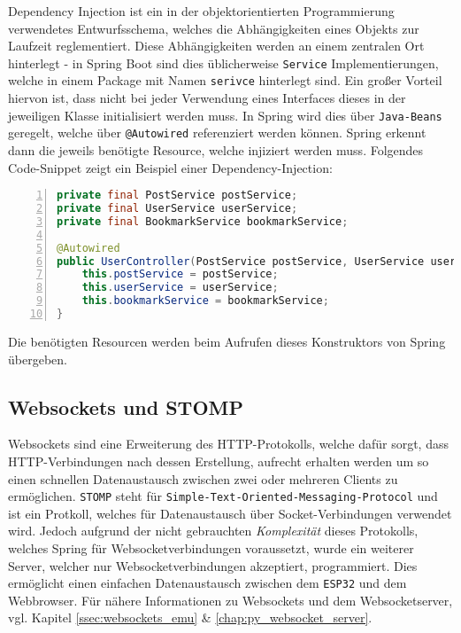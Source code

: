 \documentclass[paper=a4,12pt]{scrreprt}
\begin{document}
Dependency Injection\cite{dep_inj} ist ein in der objektorientierten Programmierung verwendetes Entwurfsschema, welches die Abhängigkeiten eines Objekts zur Laufzeit reglementiert. Diese Abhängigkeiten werden
an einem zentralen Ort hinterlegt - in Spring Boot sind dies üblicherweise \texttt{Service} Implementierungen, welche in einem Package mit Namen \texttt{serivce} hinterlegt sind.\newline
Ein großer Vorteil hiervon ist, dass nicht bei jeder Verwendung eines Interfaces dieses in der jeweiligen Klasse initialisiert werden muss. In Spring wird dies über \texttt{Java-Beans} geregelt, welche über
\texttt{@Autowired} referenziert werden können. Spring erkennt dann die jeweils benötigte Resource, welche injiziert werden muss.\newline
Folgendes Code-Snippet zeigt ein Beispiel einer Dependency-Injection:\newline

\begin{lstlisting}[caption={User - Controller, Autowired Konstrukteur}, captionpos=b, label={listing:autowired_userc}, language=java, numbers=left,
  stepnumber=1]
private final PostService postService;
private final UserService userService;
private final BookmarkService bookmarkService;

@Autowired
public UserController(PostService postService, UserService userService, BookmarkService bookmarkService){
    this.postService = postService;
    this.userService = userService;
    this.bookmarkService = bookmarkService;
}
\end{lstlisting}

Die benötigten Resourcen werden beim Aufrufen dieses Konstruktors von Spring übergeben.\newline

\subsection{Websockets und STOMP}

Websockets sind eine Erweiterung des HTTP-Protokolls, welche dafür sorgt, dass HTTP-Verbindungen nach dessen Erstellung, aufrecht erhalten werden um so einen schnellen Datenaustausch zwischen zwei oder mehreren
Clients zu ermöglichen.\newline
\texttt{STOMP}\cite{stomp} steht für \texttt{Simple-Text-Oriented-Messaging-Protocol} und ist ein Protkoll, welches für Datenaustausch über Socket-Verbindungen verwendet wird. Jedoch aufgrund der
nicht gebrauchten \textit{Komplexität} dieses Protokolls, welches Spring für Websocketverbindungen voraussetzt, wurde ein weiterer Server, welcher nur Websocketverbindungen akzeptiert, programmiert. Dies
ermöglicht einen einfachen Datenaustausch zwischen dem \texttt{ESP32} und dem Webbrowser.\newline
Für nähere Informationen zu Websockets und dem Websocketserver, vgl. Kapitel \ref{ssec:websockets_emu} \& \ref{chap:py_websocket_server}.
\end{document}
